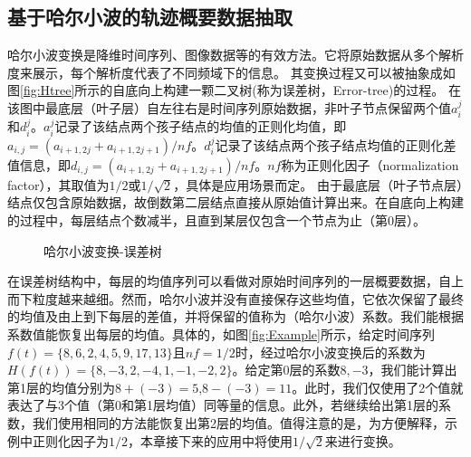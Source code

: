 \subsection{基于哈尔小波的轨迹概要数据抽取}\label{sec-c4-HaarWavelet}
哈尔小波变换是降维时间序列、图像数据等的有效方法。它将原始数据从多个解析度来展示，每个解析度代表了不同频域下的信息。
其变换过程又可以被抽象成如图\ref{fig:Htree}所示的自底向上构建一颗二叉树(称为误差树，Error-tree)的过程。
在该图中最底层（叶子层）自左往右是时间序列原始数据，非叶子节点保留两个值$a_{i}^{j}$和$d_{i}^{j}$。$a_{i}^{j}$记录了该结点两个孩子结点的均值的正则化均值，即$a_{i,j}=({a_{i+1,2j}+a_{i+1,2j+1}})/{nf}$。$d_{i}^{j}$记录了该结点两个孩子结点均值的正则化差值信息，即$d_{i,j}=({a_{i+1,2j}+a_{i+1,2j+1}})/{nf}$。$nf$称为正则化因子（normalization factor），其取值为$1/2$或$1/\sqrt{2}$，具体是应用场景而定。
由于最底层（叶子节点层）结点仅包含原始数据，故倒数第二层结点直接从原始值计算出来。在自底向上构建的过程中，每层结点个数减半，且直到某层仅包含一个节点为止（第0层）。

\begin{figure}[t]
	\centering
	\vspace{-10pt}
	\caption{哈尔小波变换-误差树}
	\label{fig:HaarTree}
	\vspace{-10pt}
\end{figure}


在误差树结构中，每层的均值序列可以看做对原始时间序列的一层概要数据，自上而下粒度越来越细。然而，哈尔小波并没有直接保存这些均值，它依次保留了最终的均值及由上到下每层的差值，并将保留的值称为（哈尔小波）系数。我们能根据系数值能恢复出每层的均值。具体的，如图\ref{fig:Example}所示，给定时间序列$f(t)=\{8,6,2,4,5,9,17,13\}$且$nf=1/2$时，经过哈尔小波变换后的系数为$H(f(t))=\{8,-3,2,-4,1,-1,-2,2\}$。给定第0层的系数$8,-3$，我们能计算出第1层的均值分别为$8+(-3)=5$,$8-(-3)=11$。此时，我们仅使用了2个值就表达了与3个值（第0和第1层均值）同等量的信息。此外，若继续给出第1层的系数，我们使用相同的方法能恢复出第2层的均值。值得注意的是，为方便解释，示例中正则化因子为$1/2$，本章接下来的应用中将使用$1/\sqrt{2}$来进行变换。

